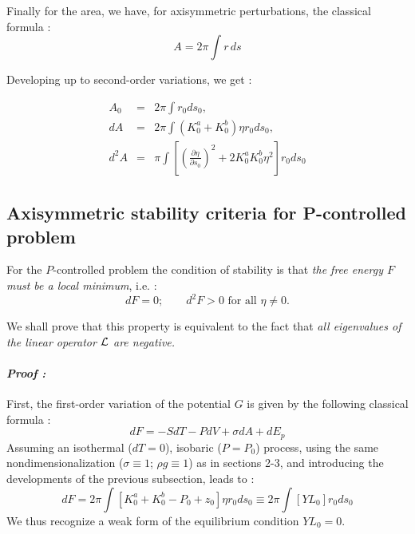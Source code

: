 \documentclass{jfm}
\newcommand\be{\begin{equation}}
\newcommand\ee{\end{equation}}
\newcommand\DP[2]{\frac{\partial #1}{\partial #2}}
\begin{document}
Finally for the area, we have, for axisymmetric perturbations, the classical formula :
\be
A = 2 \pi \int  r \, d s
\ee


Developing up to second-order variations,  we get :

\begin{eqnarray}
A_0 &=& 2 \pi \int r_0 d s_0, \\
d A &=& 2 \pi  \int \left( K_0^a + K_0^b \right) \eta r_0 d s_0, \\
d^2 A &=& \pi  \int \left[ \left( \DP{\eta}{s_0}\right)^2 + 2 K_0^a K_0^b \eta^2 \right]  r_0 d s_0
\end{eqnarray}

\subsection{Axisymmetric stability criteria for P-controlled problem} 


For the $P$-controlled problem the condition of stability is that {\em the free energy $F$ must be a local minimum}, i.e. :
\be
dF = 0 ; \qquad d^2 F > 0 \mbox{ for all } \eta \ne 0.
\ee 

We shall prove that this property is equivalent to the fact that {\em all eigenvalues of the linear operator $\cal L$ are negative.}

\paragraph{\em Proof :}

First, the first-order variation of the potential $G$ is given by the following classical formula :
$$
dF = - S dT - P dV + \sigma dA + d E_p
$$
Assuming an isothermal ($dT=0$), isobaric ($P=P_0$) process, using the same nondimensionalization ($\sigma \equiv 1$; $\rho g \equiv 1$) as in sections 2-3, and introducing the developments of the previous subsection, leads to :
\be
dF = 2 \pi \int \left[ K_0^a + K_0^b - P_0 + z_0 \right] \eta r_0 ds_0 \equiv 2 \pi \int \left[ YL_0 \right] r_0 ds_0
\ee
We thus recognize a weak form of the equilibrium condition $YL_0 = 0$. 
\end{document}
